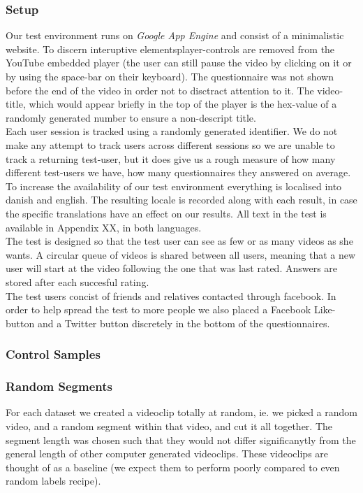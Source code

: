 \subsubsection{Setup}
%
Our test environment runs on \textit{Google App Engine} and consist of a minimalistic website. To discern interuptive elementsplayer-controls are removed from the YouTube embedded player (the user can still pause the video by clicking on it or by using the space-bar on their keyboard). The questionnaire was not shown before the end of the video in order not to disctract attention to it. The video-title, which would appear briefly in the top of the player is the hex-value of a randomly generated number to ensure a non-descript title.\\
Each user session is tracked using a randomly generated identifier. We do not make any attempt to track users across different sessions so we are unable to track a returning test-user, but it does give us a rough measure of how many different test-users we have, how many questionnaires they answered on average.\\
To increase the availability of our test environment everything is localised into danish and english. The resulting locale is recorded along with each result, in case the specific translations have an effect on our results. All text in the test is available in Appendix XX, in both languages.\\
The test is designed so that the test user can see as few or as many videos as she wants. A circular queue of videos is shared between all users, meaning that a new user will start at the video following the one that was last rated. Answers are stored after each succesful rating.\\
The test users concist of friends and relatives contacted through facebook. In order to help spread the test to more people we also placed a Facebook Like-button and a Twitter button discretely in the bottom of the questionnaires.\\
%
\subsubsection{Control Samples}
%
%
\subsubsection{Random Segments}
% 
For each dataset we created a videoclip totally at random, ie. we picked a random video, and a random segment within that video, and cut it all together. The segment length was chosen such that they would not differ significanytly from the general length of other computer generated videoclips. These videoclips are thought of as a baseline (we expect them to perform poorly compared to even random labels recipe).
%
